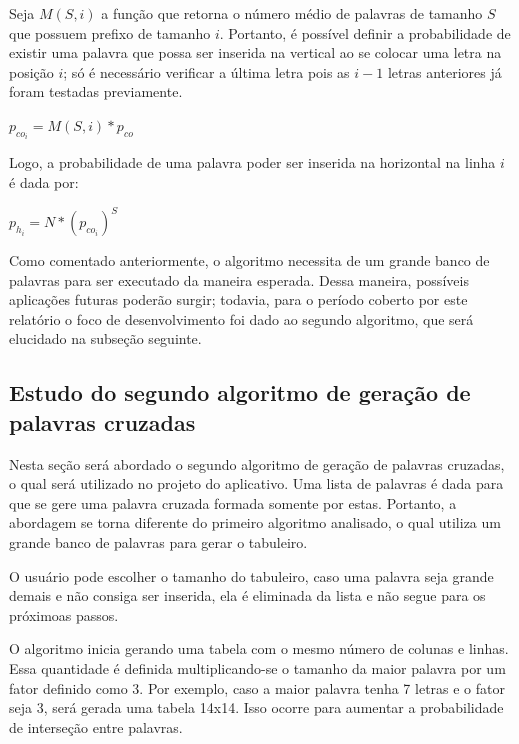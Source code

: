 Seja $M(S,i)$ a função que retorna o número médio de palavras de tamanho $S$ que possuem prefixo de tamanho $i$. Portanto, é possível definir a probabilidade de existir uma palavra que possa ser inserida na vertical ao se colocar uma letra na posição $i$; só é necessário verificar a última letra pois as $i-1$ letras anteriores já foram testadas previamente.

\begin{center}
    \Large{$p_{co_{i}} = M(S,i)*p_{co}$}
\end{center}

Logo, a probabilidade de uma palavra poder ser inserida na horizontal na linha $i$ é dada por:

\begin{center}
    \Large{$p_{h_{i}} = N*(p_{co_{i}})^{S}$}
\end{center}

Como comentado anteriormente, o algoritmo necessita de um grande banco de palavras para ser executado da maneira esperada. Dessa maneira, possíveis aplicações futuras poderão surgir; todavia, para o período coberto por este relatório o foco de desenvolvimento foi dado ao segundo algoritmo, que será elucidado na subseção seguinte.

\subsection{Estudo do segundo algoritmo de geração de palavras cruzadas}
Nesta seção será abordado o segundo algoritmo de geração de palavras cruzadas, o qual será utilizado no projeto do aplicativo. Uma lista de palavras é dada para que se gere uma palavra cruzada formada somente por estas. Portanto, a abordagem se torna diferente do primeiro algoritmo analisado, o qual utiliza um grande banco de palavras para gerar o tabuleiro.

O usuário pode escolher o tamanho do tabuleiro, caso uma palavra seja grande demais e não consiga ser inserida, ela é eliminada da lista e não segue para os próximoas passos.

O algoritmo inicia gerando uma tabela com o mesmo número de colunas e linhas. Essa quantidade é definida multiplicando-se o tamanho da maior palavra por um fator definido como 3. Por exemplo, caso a maior palavra tenha 7 letras e o fator seja 3, será gerada uma tabela 14x14. Isso ocorre para aumentar a probabilidade de interseção entre palavras. 

